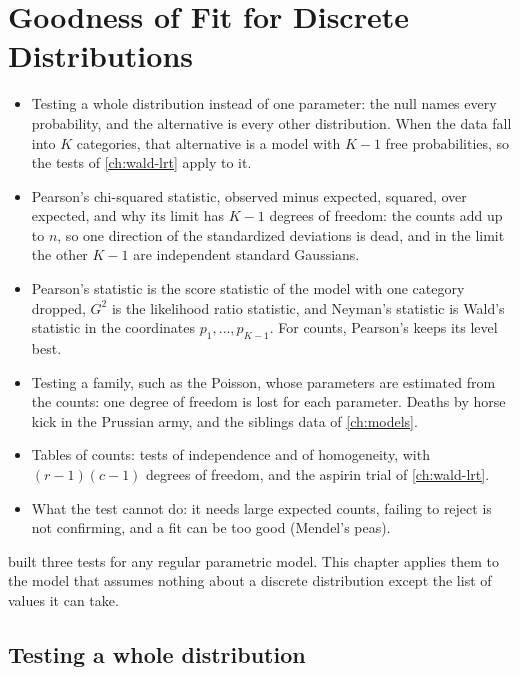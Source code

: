 \chapter{Goodness of Fit for Discrete Distributions}
\label{ch:gof}

\begin{chaptergoals}
\begin{itemize}[nosep]
\item Testing a whole distribution instead of one parameter: the null names every probability, and the alternative is every other distribution. When the data fall into $K$ categories, that alternative is a model with $K - 1$ free probabilities, so the tests of \cref{ch:wald-lrt} apply to it.
\item Pearson's chi-squared statistic, observed minus expected, squared, over expected, and why its limit has $K - 1$ degrees of freedom: the counts add up to $n$, so one direction of the standardized deviations is dead, and in the limit the other $K - 1$ are independent standard Gaussians.
\item Pearson's statistic is the score statistic of the model with one category dropped, $G^2$ is the likelihood ratio statistic, and Neyman's statistic is Wald's statistic in the coordinates $p_1, \ldots, p_{K-1}$. For counts, Pearson's keeps its level best.
\item Testing a family, such as the Poisson, whose parameters are estimated from the counts: one degree of freedom is lost for each parameter. Deaths by horse kick in the Prussian army, and the siblings data of \cref{ch:models}.
\item Tables of counts: tests of independence and of homogeneity, with $(r - 1)(c - 1)$ degrees of freedom, and the aspirin trial of \cref{ch:wald-lrt}.
\item What the test cannot do: it needs large expected counts, failing to reject is not confirming, and a fit can be too good (Mendel's peas).
\end{itemize}
 built three tests for any regular parametric model. This chapter applies them to the model that assumes nothing about a discrete distribution except the list of values it can take.
\end{chaptergoals}

\section{Testing a whole distribution}
\label{sec:gof-whole}

